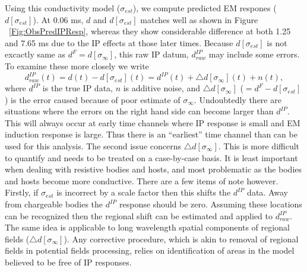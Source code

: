 \documentclass[letterpaper,11pt]{article}
\newcommand{\siginf}{\sigma_\infty}
\newcommand{\dip}{d^{IP}}
\begin{document}
Using this conductivity model ($\sigma_{est}$), we compute predicted EM respones ($d[\sigma_{est}]$). 
At 0.06 ms, $d$ and $d[\sigma_{est}]$ matches well as shown in Figure ~\ref{Fig:ObsPredIPResp}, whereas they show considerable difference at both 1.25 and 7.65 ms due to the IP effects at those later times. Because $d[\sigma_{est}]$ is not excactly same as $d^{F} = d[\siginf]$, this raw IP datum, $\dip_{raw}$ may include some errors. To examine these more closely we write
\begin{equation}
  \dip_{raw}(t) = d(t) - d[\sigma_{est}](t) = \dip(t) + \triangle d[\siginf](t) + n(t),
  \label{eq: IPdatum_obs}
\end{equation}
where $\dip$ is the true IP data, $n$ is additive noise, and $\triangle d[\siginf]$ ($=d^{F}-d[\sigma_{est}]$) is the error caused because of poor estimate of $\siginf$. 
Undoubtedly there are situations where the errors on the right hand side can become larger than $\dip$. This will always occur at early time channels where IP response is small and EM induction response is large. 
Thus there is an ``earliest'' time channel than can be used for this analysis. 
The second issue concerns $\triangle d[\siginf]$. 
This is more difficult to quantify and needs to be treated on a case-by-case basis. 
It is least important when dealing with resistive bodies and hosts, and most problematic as the bodies and hosts become more conductive. 
There are a few items of note however. 
Firstly, if $\sigma_{est}$ is incorrect by a scale factor then this shifts the $\dip$ data. 
Away from chargeable bodies the $\dip$ response should be zero. 
Assuming these locations can be recognized then the regional shift can be estimated and applied to $\dip_{raw}$. 
The same idea is applicable to long wavelength spatial components of regional fields ($\triangle d[\siginf]$). Any corrective procedure, which is akin to removal of regional fields in potential fields processing, relies on identification of areas in the model believed to be free of IP responses. 
\end{document}
